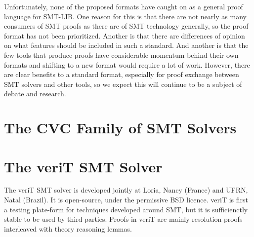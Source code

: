 \documentclass{llncs}
\newcommand{\Note}[1]{\textcolor{blue}{[#1]}}
\begin{document}
Unfortunately, none of the proposed formats have caught on as a general proof
language for SMT-LIB.  One reason for this is that there are not nearly as many
consumers of SMT proofs as there are of SMT technology generally, so the proof
format has not been prioritized.  Another is that there are differences of
opinion on what features should be included in such a standard.  And another is
that the few tools that produce proofs have considerable momentum behind their
own formats and shifting to a new format would require a lot of work.  However,
there are clear benefits to a standard format, especially for proof exchange
between SMT solvers and other tools, so we expect this will continue to be a
subject of debate and research.



\section{The CVC Family of SMT Solvers}
\label{sec:cvc}


\section{The veriT SMT Solver}
\label{sec:veriT}

The veriT SMT solver is developed jointly at Loria, Nancy (France) and UFRN,
Natal (Brazil).  It is open-source, under the permissive BSD licence.  veriT is
first a testing plate-form for techniques developed around SMT, but it is
sufficienctly stable to be used by third parties.  Proofs in veriT are mainly
resolution proofs interleaved with theory reasoning lemmas.
\end{document}

